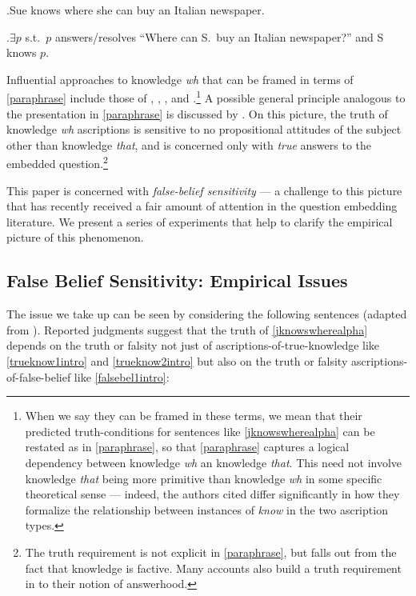 \documentclass[a4paper]{article}
\begin{document}
\ex.\label{jknowswherealpha}\label{sueknows}Sue knows where she can buy an Italian newspaper.

\ex.\label{paraphrase}$\exists p$ s.t.\ $p$ answers/resolves ``Where can S.\ buy an Italian newspaper?'' and S knows $p$.

Influential approaches to knowledge \textit{wh} that can be framed in terms of \ref{paraphrase} include those of \citet{karttunen:77}, \citet{gs:84}, \citet{br:99}, and \citet{lahiri:02}.\footnote{When we say they can be framed in these terms, we mean that their predicted truth-conditions for sentences like \ref{jknowswherealpha} can be restated as in \ref{paraphrase}, so that \ref{paraphrase} captures a logical dependency between knowledge \textit{wh} an knowledge \textit{that}. This need not involve knowledge \textit{that} being more primitive than knowledge \textit{wh} in some specific theoretical sense --- indeed, the authors cited differ significantly in how they formalize the relationship between instances of \textit{know} in the two ascription types.} A possible general principle analogous to the presentation in \ref{paraphrase} is discussed by \citet{higginbotham:96}. On this picture, the truth of knowledge \textit{wh} ascriptions is sensitive to no propositional attitudes of the subject other than knowledge \textit{that}, and is concerned only with \emph{true} answers to the embedded question.\footnote{The truth requirement is not explicit in \ref{paraphrase}, but falls out from the fact that knowledge is factive. Many accounts also build a truth requirement in to their notion of answerhood.}


This paper is concerned with \emph{false-belief sensitivity} --- a challenge to this picture that has recently received a fair amount of attention in the question embedding literature. We present a series of experiments that help to clarify the empirical picture of this phenomenon.

\subsection{False Belief Sensitivity: Empirical Issues}

The issue we take up can be seen by considering the following sentences (adapted from \citet{george:dis}). Reported judgments suggest that the truth of \ref{jknowswherealpha} depends on the truth or falsity not just of ascriptions-of-true-knowledge like \ref{trueknow1intro} and \ref{trueknow2intro} but also on the truth or falsity ascriptions-of-false-belief like \ref{falsebel1intro}:
\end{document}
